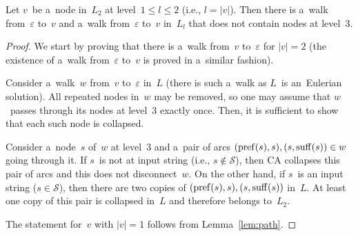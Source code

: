 \begin{lemma}\label{lemma:toepsilon}
Let $v$~be a~node in~$L_2$ at level~$1 \le l \le 2$ (i.e., $l=|v|$). Then there is a~walk from~$\varepsilon$ to~$v$ and a~walk from~$\varepsilon$ to~$v$ in~$L_l$ that does not contain nodes at level~3.
\end{lemma}
\begin{proof}
We start by proving that there is a~walk from~$v$ to~$\varepsilon$ 
for $|v|=2$ (the existence of a~walk from~$\varepsilon$ to~$v$ is proved in a~similar fashion).

Consider a~walk~$w$ from~$v$ to~$\varepsilon$ in~$L$ (there is such a~walk as $L$~is an~Eulerian solution). All repeated nodes in~$w$ may be removed, 
so one may assume that $w$~passes through its nodes at level~3 exactly once. Then, it is sufficient to show that each such node is collapsed.

Consider a~node~$s$ of~$w$ at level~3 and a~pair of arcs  $(\operatorname{pref}(s), s), (s, \operatorname{suff}(s)) \in w$ going through it. If $s$~is not at input string (i.e., $s \not \in \mathcal{S}$), then CA collapses this pair of arcs and this does not disconnect~$w$. On the other hand, if $s$~is an input string ($s \in \mathcal{S}$), then there are two copies of $(\operatorname{pref}(s), s), (s, \operatorname{suff}(s))$ in~$L$. At least one copy of this pair is collapsed in~$L$ and therefore belongs to~$L_2$.

The statement for~$v$ with $|v|=1$ follows from Lemma~\ref{lem:path}.
\end{proof}

